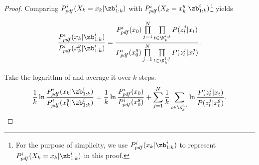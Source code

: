 \begin{proof}
		Comparing $P^i_{pdf}(X_k=x_k|\zb^i_{1:k})$ with $P^i_{pdf}(X_k=x^g_k|\zb^i_{1:k})$\footnote{For the purpose of simplicity, we use $P^i_{pdf}(x_k|\zb^i_{1:k})$ to represent $P^i_{pdf}(X_k=x_k|\zb^i_{1:k})$ in this proof.} yields

		\small\begin{equation}\label{eqn:cmp}
			\frac{P^i_{pdf}(x_k|\zb^i_{1:k})}{P^i_{pdf}(x^g_k|\zb^i_{1:k})}=\frac{P^i_{pdf}(x_0)\prod\limits_{j=1}^{N}\prod\limits_{t\in\K^{i,j}_{k}}P(z^j_t|x_t)}{P^i_{pdf}(x^g_0)\prod\limits_{j=1}^{N}\prod\limits_{t\in\K^{i,j}_{k}}P(z^j_t|x^g_t)}.
		\end{equation}\normalsize
		
		
		
		Take the logarithm of  and average it over $k$ steps:
		\small\begin{equation}\label{eqn:cmp_log}
			\frac{1}{k}\ln\frac{P^i_{pdf}(x_k|\zb^i_{1:k})}{P^i_{pdf}(x^g_k|\zb^i_{1:k})}=\frac{1}{k}\ln\frac{P^i_{pdf}(x_0)}{P^i_{pdf}(x^g_0)}+\sum\limits_{j=1}^{N}\frac{1}{k}\sum\limits_{t\in\K^{i,j}_{k}}\ln\frac{P(z^j_t|x_t)}{P(z^j_t|x^g_t)}.
		\end{equation}\normalsize
		

\end{proof}
